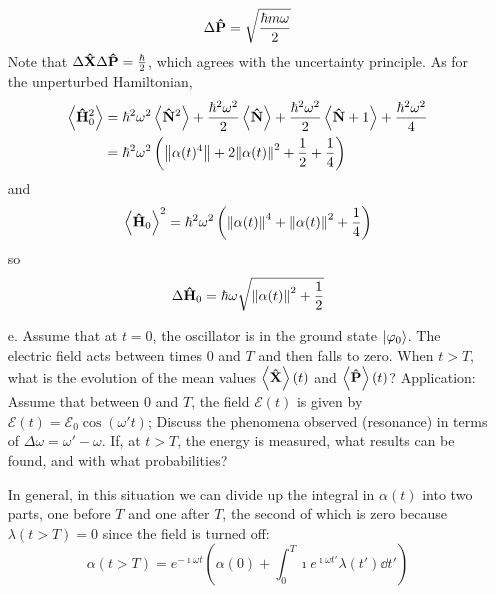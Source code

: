 \documentclass[a4paper,twoside]{article}
\begin{document}
\begin{itemize}
\begin{problem}
            \begin{equation}
                \Delta \vu{P} = \sqrt{\frac{\hbar m \omega}{2}}
            \end{equation}
            Note that $ \Delta \vu{X} \Delta \vu{P} = \frac{\hbar}{2} $, which agrees with the uncertainty principle.
            As for the unperturbed Hamiltonian,
            \begin{align}
                \ev{ \vu{H}_0^2} &= \hbar^2 \omega^2 \ev{ \vu{N}^2} + \frac{\hbar^2 \omega^2}{2} \ev{ \vu{N}} + \frac{\hbar^2 \omega^2}{2} \ev{ \vu{N} + 1} + \frac{\hbar^2 \omega^2}{4} \\
                &= \hbar^2 \omega^2 \left( \norm{\alpha(t)^4} + 2\norm{\alpha(t)}^2 + \frac{1}{2} + \frac{1}{4} \right) 
            \end{align}
            and
            \begin{equation}
                \ev{ \vu{H}_0}^2 = \hbar^2 \omega^2 \left( \norm{\alpha(t)}^4 + \norm{\alpha(t)}^2 + \frac{1}{4} \right)
            \end{equation}
            so
            \begin{equation}
                \Delta \vu{H}_0 = \hbar \omega \sqrt{\norm{\alpha(t)}^2 + \frac{1}{2}}
            \end{equation}
        \end{problem}
    \item[e.] Assume that at $ t = 0 $, the oscillator is in the ground state $\ket{\varphi_0} $. The electric field acts between times $ 0 $ and $ T $ and then falls to zero. When $ t > T $, what is the evolution of the mean values $ \ev{\vu{X}}(t) $ and $ \ev{\vu{P}}(t) $? Application: Assume that between $ 0 $ and $ T $, the field $ \mathscr{E}(t) $ is given by $ \mathscr{E}(t) = \mathscr{E}_0 \cos(\omega' t) $; Discuss the phenomena observed (resonance) in terms of $ \Delta \omega = \omega' - \omega $. If, at $ t > T $, the energy is measured, what results can be found, and with what probabilities?
        \begin{problem}
            In general, in this situation we can divide up the integral in $ \alpha(t) $ into two parts, one before $ T $ and one after $ T $, the second of which is zero because $ \lambda(t>T) = 0 $ since the field is turned off:
            \begin{equation}
                \alpha(t>T) = e^{- \imath \omega t} \left( \alpha(0) + \int_0^T \imath e^{\imath \omega t'} \lambda(t') \dd{t'} \right)
            \end{equation}

\end{problem}
\end{itemize}
\end{document}
